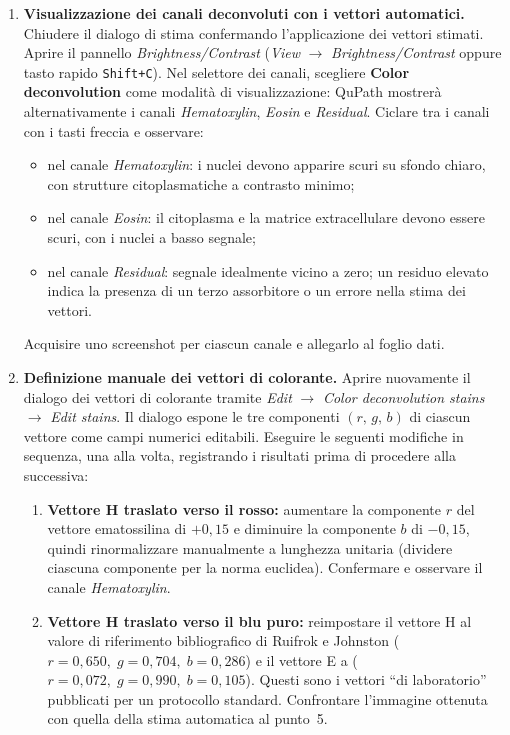 \begin{enumerate}
    \item \textbf{Visualizzazione dei canali deconvoluti con i vettori automatici.}
    Chiudere il dialogo di stima confermando l'applicazione dei vettori stimati. Aprire il
    pannello \textit{Brightness/Contrast} (\textit{View} $\to$ \textit{Brightness/Contrast}
    oppure tasto rapido \texttt{Shift+C}). Nel selettore dei canali, scegliere
    \textbf{Color deconvolution} come modalità di visualizzazione: QuPath mostrerà
    alternativamente i canali \textit{Hematoxylin}, \textit{Eosin} e \textit{Residual}.
    Ciclare tra i canali con i tasti freccia e osservare:
    \begin{itemize}
        \item nel canale \textit{Hematoxylin}: i nuclei devono apparire scuri su sfondo chiaro,
        con strutture citoplasmatiche a contrasto minimo;
        \item nel canale \textit{Eosin}: il citoplasma e la matrice extracellulare devono essere
        scuri, con i nuclei a basso segnale;
        \item nel canale \textit{Residual}: segnale idealmente vicino a zero; un residuo elevato
        indica la presenza di un terzo assorbitore o un errore nella stima dei vettori.
    \end{itemize}
    Acquisire uno screenshot per ciascun canale e allegarlo al foglio dati.

    \item \textbf{Definizione manuale dei vettori di colorante.}
    Aprire nuovamente il dialogo dei vettori di colorante tramite \textit{Edit}
    $\to$ \textit{Color deconvolution stains} $\to$ \textit{Edit stains}. Il dialogo espone
    le tre componenti $(r,\,g,\,b)$ di ciascun vettore come campi numerici editabili.
    Eseguire le seguenti modifiche in sequenza, una alla volta, registrando i risultati prima
    di procedere alla successiva:

    \begin{enumerate}[label=\alph*.]
        \item \textbf{Vettore H traslato verso il rosso:} aumentare la componente $r$ del
        vettore ematossilina di $+0{,}15$ e diminuire la componente $b$ di $-0{,}15$, quindi
        rinormalizzare manualmente a lunghezza unitaria (dividere ciascuna componente per la
        norma euclidea). Confermare e osservare il canale \textit{Hematoxylin}.

        \item \textbf{Vettore H traslato verso il blu puro:} reimpostare il vettore H al valore
        di riferimento bibliografico di Ruifrok e Johnston
        ($r=0{,}650,\;g=0{,}704,\;b=0{,}286$) e il vettore E a
        ($r=0{,}072,\;g=0{,}990,\;b=0{,}105$). Questi sono i vettori ``di laboratorio''
        pubblicati per un protocollo standard. Confrontare l'immagine ottenuta con quella della
        stima automatica al punto~5.


\end{enumerate}
\end{enumerate}
